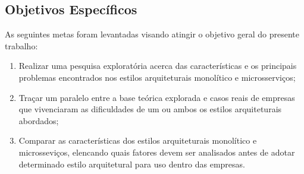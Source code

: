 \subsection{Objetivos Específicos}

As seguintes metas foram levantadas visando atingir o objetivo geral do presente
trabalho:

  \begin{enumerate}
      \item Realizar uma pesquisa exploratória acerca das características e os principais problemas
          encontrados nos estilos arquiteturais monolítico e microsserviços;
      \item Traçar um paralelo entre a base teórica explorada e casos reais de empresas que
          vivenciaram as dificuldades de um ou ambos os estilos arquiteturais abordados;
      \item Comparar as características dos estilos arquiteturais monolítico e microsseviços,
          elencando quais fatores devem ser analisados antes de adotar determinado estilo
          arquitetural para uso dentro das empresas.
  \end{enumerate}
